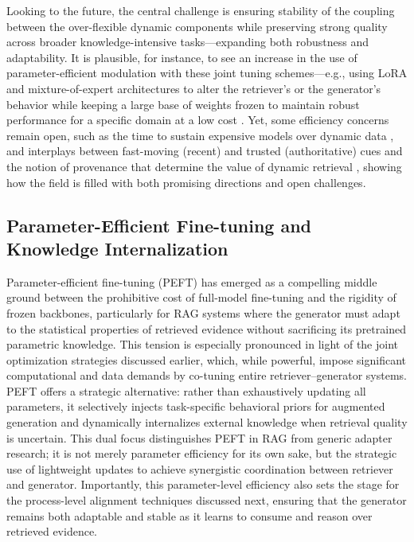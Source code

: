 \documentclass[11pt,a4paper]{article}
\begin{document}
Looking to the future, the central challenge is ensuring stability of the coupling between the over-flexible dynamic components while preserving strong quality across broader knowledge-intensive tasks---expanding both robustness \cite{arxiv:2309.01431v2,arxiv:2603.05698v2} and adaptability. It is plausible, for instance, to see an increase in the use of parameter-efficient modulation with these joint tuning schemes---e.g., using LoRA and mixture-of-expert architectures to alter the retriever's or the generator's behavior while keeping a large base of weights frozen to maintain robust performance for a specific domain at a low cost \cite{arxiv:2501.11929v1,arxiv:2410.01782v1}. Yet, some efficiency concerns remain open, such as the time to sustain expensive models over dynamic data \cite{arxiv:2410.12837v1}, and interplays between fast-moving (recent) and trusted (authoritative) cues and the notion of provenance that determine the value of dynamic retrieval \cite{arxiv:2312.10997v5}, showing how the field is filled with both promising directions and open challenges.


\subsection{Parameter-Efficient Fine-tuning and Knowledge Internalization}


Parameter-efficient fine-tuning (PEFT) has emerged as a compelling middle ground between the prohibitive cost of full-model fine-tuning and the rigidity of frozen backbones, particularly for RAG systems where the generator must adapt to the statistical properties of retrieved evidence without sacrificing its pretrained parametric knowledge. This tension is especially pronounced in light of the joint optimization strategies discussed earlier, which, while powerful, impose significant computational and data demands by co-tuning entire retriever--generator systems. PEFT offers a strategic alternative: rather than exhaustively updating all parameters, it selectively injects task-specific behavioral priors for augmented generation and dynamically internalizes external knowledge when retrieval quality is uncertain. This dual focus distinguishes PEFT in RAG from generic adapter research; it is not merely parameter efficiency for its own sake, but the strategic use of lightweight updates to achieve synergistic coordination between retriever and generator. Importantly, this parameter-level efficiency also sets the stage for the process-level alignment techniques discussed next, ensuring that the generator remains both adaptable and stable as it learns to consume and reason over retrieved evidence.
\end{document}
